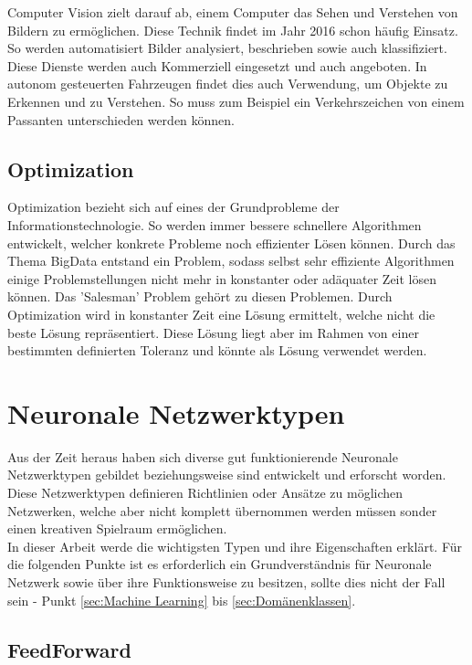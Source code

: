 Computer Vision zielt darauf ab, einem Computer das Sehen und Verstehen von Bildern zu ermöglichen. 
Diese Technik findet im Jahr 2016 schon häufig Einsatz. 
So werden automatisiert Bilder analysiert, beschrieben sowie auch klassifiziert. 
Diese Dienste werden auch Kommerziell eingesetzt und auch angeboten. 
In autonom gesteuerten Fahrzeugen findet dies auch Verwendung, um Objekte zu Erkennen und zu Verstehen. 
So muss zum Beispiel ein Verkehrszeichen von einem Passanten unterschieden werden können.

\subsection{Optimization}
\label{subsec:Optimization}

Optimization bezieht sich auf eines der Grundprobleme der Informationstechnologie. 
So werden immer bessere schnellere Algorithmen entwickelt, welcher konkrete Probleme noch effizienter Lösen können. 
Durch das Thema BigData entstand ein Problem, sodass selbst sehr effiziente Algorithmen einige Problemstellungen nicht mehr in konstanter oder adäquater Zeit lösen können. 
Das 'Salesman' Problem gehört zu diesen Problemen. 
Durch Optimization wird in konstanter Zeit eine Lösung ermittelt, welche nicht die beste Lösung repräsentiert. 
Diese Lösung liegt aber im Rahmen von einer bestimmten definierten Toleranz und könnte als Lösung verwendet werden.


\section{Neuronale Netzwerktypen}

Aus der Zeit heraus haben sich diverse gut funktionierende Neuronale Netzwerktypen gebildet beziehungsweise sind entwickelt und erforscht worden. 
Diese Netzwerktypen definieren Richtlinien oder Ansätze zu möglichen Netzwerken, welche aber nicht komplett übernommen werden müssen sonder einen kreativen Spielraum ermöglichen. \\

In dieser Arbeit werde die wichtigsten Typen und ihre Eigenschaften erklärt. 
Für die folgenden Punkte ist es erforderlich ein Grundverständnis für Neuronale Netzwerk sowie über ihre Funktionsweise zu besitzen, sollte dies nicht der Fall sein - Punkt \ref{sec:Machine Learning} bis \ref{sec:Domänenklassen}.

\subsection{FeedForward}
\label{subsec:FeedForward}

